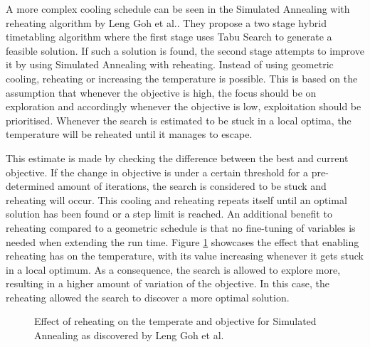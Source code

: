 A more complex cooling schedule can be seen in the Simulated Annealing with reheating algorithm by Leng Goh et al.\cite{Goh2017}. They propose a two stage hybrid timetabling algorithm where the first stage uses Tabu Search to generate a feasible solution. If such a solution is found, the second stage attempts to improve it by using Simulated Annealing with reheating. Instead of using geometric cooling, reheating or increasing the temperature is possible. This is based on the assumption that whenever the objective is high, the focus should be on exploration and accordingly whenever the objective is low, exploitation should be prioritised. Whenever the search is estimated to be stuck in a local optima, the temperature will be reheated until it manages to escape. 

This estimate is made by checking the difference between the best and current objective. If the change in objective is under a certain threshold for a pre-determined amount of iterations, the search is considered to be stuck and reheating will occur. This cooling and reheating repeats itself until an optimal solution has been found or a step limit is reached. An additional benefit to reheating compared to a geometric schedule is that no fine-tuning of variables is needed when extending the run time. Figure \ref{fig:SAR} showcases the effect that enabling reheating has on the temperature, with its value increasing whenever it gets stuck in a local optimum. As a consequence, the search is allowed to explore more, resulting in a higher amount of variation of the objective. In this case, the reheating allowed the search to discover a more optimal solution.

\begin{figure}[H]
  \centering
  \hfill
  \caption{Effect of reheating on the temperate and objective for Simulated Annealing as discovered by Leng Goh et al.\cite{Goh2017}}
  \label{fig:SAR}
\end{figure}


